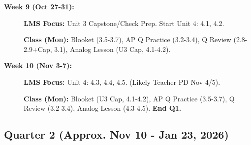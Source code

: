 \documentclass[11pt]{article}
\begin{document}
\begin{description}
  \item[\textbf{Week 9 (Oct 27-31):}] \textbf{LMS Focus:} Unit 3 Capstone/Check Prep. Start Unit 4: 4.1, 4.2.
  
  \textbf{Class (Mon):} Blooket (3.5-3.7), AP Q Practice (3.2-3.4), Q Review (2.8-2.9+Cap, 3.1), Analog Lesson (U3 Cap, 4.1-4.2).
  
  \item[\textbf{Week 10 (Nov 3-7):}] \textbf{LMS Focus:} Unit 4: 4.3, 4.4, 4.5. (Likely Teacher PD Nov 4/5).
  
  \textbf{Class (Mon):} Blooket (U3 Cap, 4.1-4.2), AP Q Practice (3.5-3.7), Q Review (3.2-3.4), Analog Lesson (4.3-4.5). \textbf{End Q1.}
\end{description}

\subsection*{\textcolor{lynnmaroon}{Quarter 2 (Approx. Nov 10 - Jan 23, 2026)}}
\end{document}
